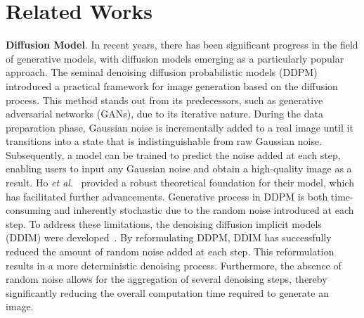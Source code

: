 \documentclass[letterpaper]{article} %
\begin{document}
\section{Related Works}
\label{Re_works}

\textbf{Diffusion Model}.
%
%
In recent years, there has been significant progress in the field of generative models, with diffusion models emerging as a particularly popular approach.
%
The seminal denoising diffusion probabilistic models (DDPM)~\cite{ho2020denoising} introduced a practical framework for image generation based on the diffusion process.
%
This method stands out from its predecessors, such as generative adversarial networks (GANs), due to its iterative nature.
%
During the data preparation phase, Gaussian noise is incrementally added to a real image until it transitions into a state that is indistinguishable from raw Gaussian noise.
%
Subsequently, a model can be trained to predict the noise added at each step, enabling users to input any Gaussian noise and obtain a high-quality image as a result.
%
Ho \emph{et al}.~\cite{ho2020denoising} provided a robust theoretical foundation for their model, which has facilitated further advancements.
%
Generative process in DDPM is both time-consuming and inherently stochastic due to the random noise introduced at each step. To address these limitations, the denoising diffusion implicit models (DDIM) were developed~\cite{song2020denoising}. 
%
By reformulating DDPM, DDIM has successfully reduced the amount of random noise added at each step. This reformulation results in a more deterministic denoising process. Furthermore, the absence of random noise allows for the aggregation of several denoising steps, thereby significantly reducing the overall computation time required to generate an image.
\end{document}
